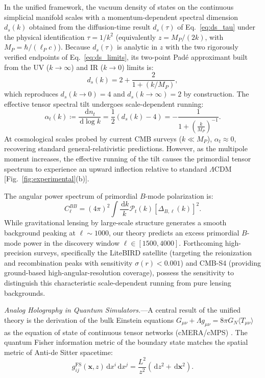 \documentclass[aps,prl,reprint,twocolumn,superscriptaddress,nofootinbib,floatfix]{revtex4-2}
\newcommand{\dif}{\,\mathrm{d}}
\begin{document}
In the unified framework, the vacuum density of states on the continuous simplicial manifold scales with a momentum-dependent spectral dimension $d_s(k)$ obtained from the diffusion-time result $d_s(\tau)$ of Eq.~\eqref{eq:ds_tau} under the physical identification $\tau = 1/k^2$ (equivalently $z = M_P/(2k)$, with $M_P = \hbar/(\ell_P c)$). Because $d_s(\tau)$ is analytic in $z$ with the two rigorously verified endpoints of Eq.~\eqref{eq:ds_limits}, its two-point Pad\'e approximant built from the UV ($k \to \infty$) and IR ($k \to 0$) limits is:
\begin{equation}
    d_s(k) = 2 + \frac{2}{1 + (k/M_P)},
\end{equation}
which reproduces $d_s(k \to 0) = 4$ and $d_s(k \to \infty) = 2$ by construction. The effective tensor spectral tilt undergoes scale-dependent running:
\begin{equation}
    \label{eq:tensor_running}
    \alpha_t(k) \coloneqq \frac{\dif n_t}{\dif \log k} = \frac{1}{2} \left( d_s(k) - 4 \right) = -\frac{1}{1 + \left( \frac{k}{M_P} \right)^{-1}}.
\end{equation}
At cosmological scales probed by current CMB surveys ($k \ll M_P$), $\alpha_t \approx 0$, recovering standard general-relativistic predictions. However, as the multipole moment increases, the effective running of the tilt causes the primordial tensor spectrum to experience an upward inflection relative to standard $\Lambda\mathrm{CDM}$ [Fig.~\ref{fig:experimental}(b)].

The angular power spectrum of primordial $B$-mode polarization is:
\begin{equation}
    C_\ell^{BB} = (4\pi)^2 \int \frac{\dif k}{k} \mathcal{P}_t(k) \left[ \Delta_{B, \ell}(k) \right]^2.
\end{equation}
While gravitational lensing by large-scale structure generates a smooth background peaking at $\ell \sim 1000$, our theory predicts an excess primordial $B$-mode power in the discovery window $\ell \in [1500, 4000]$. Forthcoming high-precision surveys, specifically the LiteBIRD satellite \cite{hazumi2019litebird} (targeting the reionization and recombination peaks with sensitivity $\sigma(r) < 0.001$) and CMB-S4 \cite{abazajian2016cmb} (providing ground-based high-angular-resolution coverage), possess the sensitivity to distinguish this characteristic scale-dependent running from pure lensing backgrounds.

\emph{Analog Holography in Quantum Simulators.}---A central result of the unified theory is the derivation of the bulk Einstein equations $G_{\mu\nu} + \Lambda g_{\mu\nu} = 8\pi G_N \langle T_{\mu\nu} \rangle$ as the equation of state of continuous tensor networks (cMERA/cMPS) \cite{silvafilho2026spacetime}. The quantum Fisher information metric of the boundary state matches the spatial metric of Anti-de Sitter spacetime:
\begin{equation}
    g_{ij}^{\mathrm{FS}}(\mathbf{x}, z) \dif x^i \dif x^j = \frac{L^2}{z^2} \left( \dif z^2 + \dif \mathbf{x}^2 \right).
\end{equation}
\end{document}
